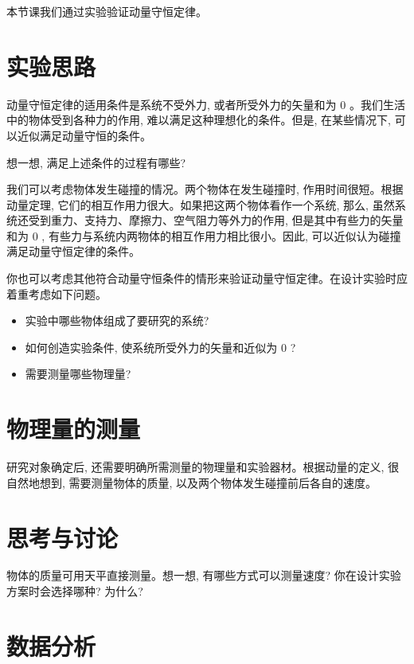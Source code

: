 \documentclass[10pt]{article}
\begin{document}
本节课我们通过实验验证动量守恒定律。

\section*{实验思路}

动量守恒定律的适用条件是系统不受外力, 或者所受外力的矢量和为 0 。我们生活中的物体受到各种力的作用, 难以满足这种理想化的条件。但是, 在某些情况下, 可以近似满足动量守恒的条件。

想一想, 满足上述条件的过程有哪些?

我们可以考虑物体发生碰撞的情况。两个物体在发生碰撞时, 作用时间很短。根据动量定理, 它们的相互作用力很大。如果把这两个物体看作一个系统, 那么, 虽然系统还受到重力、支持力、摩擦力、空气阻力等外力的作用, 但是其中有些力的矢量和为 0 , 有些力与系统内两物体的相互作用力相比很小。因此, 可以近似认为碰撞满足动量守恒定律的条件。

你也可以考虑其他符合动量守恒条件的情形来验证动量守恒定律。在设计实验时应着重考虑如下问题。

\begin{itemize}
\item 实验中哪些物体组成了要研究的系统?
\end{itemize}

\begin{itemize}
\item 如何创造实验条件, 使系统所受外力的矢量和近似为 0 ?
\end{itemize}

\begin{itemize}
\item 需要测量哪些物理量?
\end{itemize}

\section*{物理量的测量}

研究对象确定后, 还需要明确所需测量的物理量和实验器材。根据动量的定义, 很自然地想到, 需要测量物体的质量, 以及两个物体发生碰撞前后各自的速度。

\section*{思考与讨论}

物体的质量可用天平直接测量。想一想, 有哪些方式可以测量速度? 你在设计实验方案时会选择哪种? 为什么?

\section*{数据分析}
\end{document}
